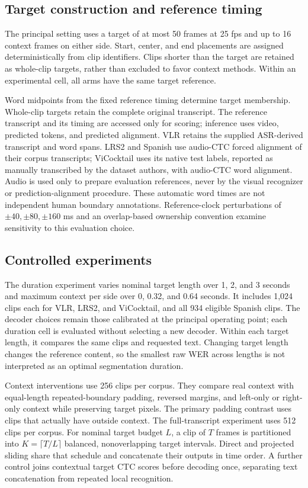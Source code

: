 \subsection{Target construction and reference timing}
The principal setting uses a target of at most 50 frames at 25 fps and up to
16 context frames on either side. Start, center, and end placements are assigned
deterministically from clip identifiers. Clips shorter than the target are
retained as whole-clip targets, rather than excluded to favor context methods.
Within an experimental cell, all arms have the same target reference.

Word midpoints from the fixed reference timing determine target membership.
Whole-clip targets retain the complete original transcript. The reference
transcript and its timing are accessed only for scoring; inference uses video,
predicted tokens, and predicted alignment. VLR retains the supplied
ASR-derived transcript and word spans. LRS2 and Spanish use audio-CTC
forced alignment of their corpus transcripts; ViCocktail uses its native
test labels, reported as manually transcribed by the dataset authors,
with audio-CTC word alignment. Audio is used only to prepare evaluation
references, never by the visual recognizer or prediction-alignment procedure.
These automatic word times are not independent human boundary annotations.
Reference-clock perturbations of \(\pm40,\pm80,\pm160\) ms and an overlap-based
ownership convention examine sensitivity to this evaluation choice.

\subsection{Controlled experiments}
The duration experiment varies nominal target length over 1, 2, and 3 seconds
and maximum context per side over 0, 0.32, and 0.64 seconds. It includes 1,024
clips each for VLR, LRS2, and ViCocktail, and all 934 eligible Spanish clips.
The decoder choices remain those calibrated at the principal operating point;
each duration cell is evaluated without selecting a new decoder.
Within each target
length, it compares the same clips and requested text. Changing target length
changes the reference content, so the smallest raw WER across lengths is not
interpreted as an optimal segmentation duration.

Context interventions use 256 clips per corpus. They compare real context
with equal-length repeated-boundary padding, reversed margins, and left-only
or right-only context while preserving target pixels. The primary padding
contrast uses clips that actually have outside context.
The full-transcript experiment uses 512 clips per corpus. For nominal target
budget \(L\), a clip of \(T\) frames is partitioned into
\(K=\lceil T/L\rceil\) balanced, nonoverlapping target intervals. Direct and
projected sliding share that schedule and concatenate their outputs in time
order. A further control joins contextual target CTC scores before decoding
once, separating text concatenation from repeated local recognition.

